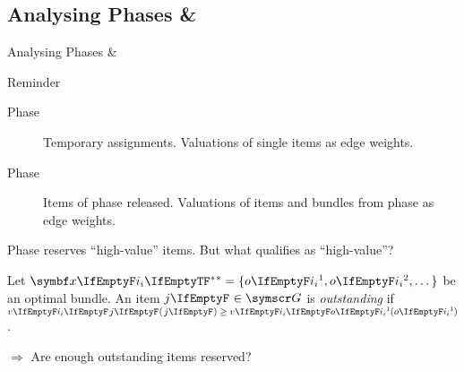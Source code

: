 \subsection{Analysing Phases \texorpdfstring{\phasei{} \& \phaseiii}{I \& III}}
\begin{frame}{Analysing Phases \phasei{} \& \phaseiii}
	\adjustfortopblock
	\begin{block}{Reminder\vphantom{(15)}}
		\begin{description}
			\item[Phase \phasei]
			Temporary assignments.
			Valuations of single items as edge weights.

			\item[Phase \phaseiii]
			Items of phase \phasei{} released.
			Valuations of items and bundles from phase \phaseii{} as edge weights.
		\end{description}
	\end{block}

	Phase \phasei{} reserves \enquote{high-value} items.
	But what qualifies as \enquote{high-value}?

	\begin{definition}[14]
		Let \(\alloc* = \{ \asgd*{1}, \asgd*{2}, \dots\}\) be an optimal bundle.
		An item \(\genericitem \in \goods\) is \emph{outstanding} if \(\valuations[ \hairspace \genericitem] \ge \valuations[\asgd*{1}]\).
	\end{definition}

	\medskip
	\(\Rightarrow\) Are enough outstanding items reserved?
\end{frame}





